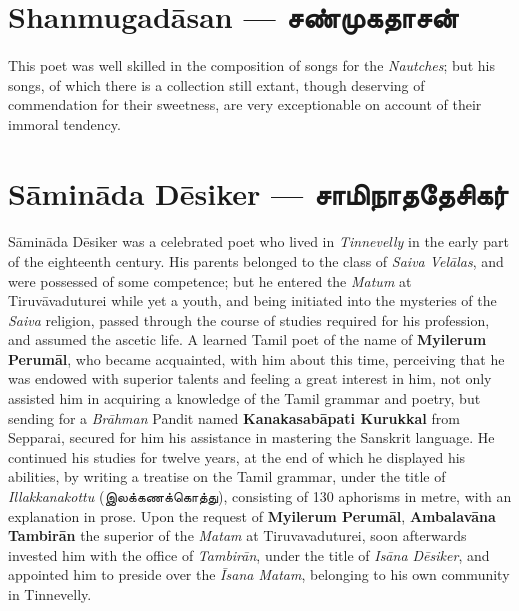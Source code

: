 \documentclass{article}
\newcommand{\TamilText}[1]{\texttamil{#1}}
\newcommand{\TamilBold}[1]{\texttamil{\textbf{#1}}}
\newcommand{\tam}[1]{\TamilText{#1}}
\newcommand{\tambold}[1]{\TamilBold{#1}}
\begin{document}
\section{Shanmugad\={a}san --- \tambold{சண்முகதாசன்}}
\paragraph{}
This poet was well skilled in the composition of songs for the \emph{Nautches}; but his songs, of which there is a collection still extant, though deserving of commendation for their sweetness, are very exceptionable on account of their immoral tendency.

\section{S\={a}min\={a}da D\={e}siker --- \tambold{சாமிநாததேசிகர்}}
\paragraph{}
S\={a}min\={a}da D\={e}siker was a celebrated poet who lived in \emph{Tinnevelly} in the early part of the eighteenth century. His parents belonged to the class of \emph{Saiva Vel\={a}las}, and were possessed of some competence; but he entered the \emph{Matum} at Tiruv\={a}vaduturei while yet a youth, and being initiated into the mysteries of the \emph{Saiva} religion, passed through the course of studies required for his profession, and assumed the ascetic life. A learned Tamil poet of the name of \textbf{Myilerum Perum\={a}l}, who became acquainted, with him about this time, perceiving that he was endowed with superior talents and feeling a great interest in him, not only assisted him in acquiring a knowledge of the Tamil grammar and poetry, but sending for a \emph{Br\={a}hman} Pandit named \textbf{Kanakasab\={a}pati Kurukkal} from Sepparai, secured for him his assistance in mastering the Sanskrit language. He continued his studies for twelve years, at the end of which he displayed his abilities, by writing a treatise on the Tamil grammar, under the title of \emph{Illakkanakottu} (\tam{இலக்கணக்கொத்து}), consisting of 130 aphorisms in metre, with an explanation in prose. Upon the request of \textbf{Myilerum Perum\={a}l}, \textbf{Ambalav\={a}na Tambir\={a}n} the superior of the \emph{Matam} at Tiruvavaduturei, soon afterwards invested him with the office of \emph{Tambir\={a}n}, under the title of \emph{Is\={a}na D\={e}siker}, and appointed him to preside over the \emph{\={I}sana Matam}, belonging to his own community in Tinnevelly.
\end{document}
